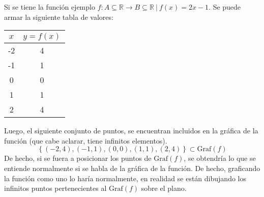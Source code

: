 \begin{example}
    Si se tiene la función ejemplo $f: A \subseteq \mathbb{R} \rightarrow B \subseteq \mathbb{R} \:|\: f(x)=2x-1$.
    Se puede armar la siguiente tabla de valores:
    \begin{table}[H]
        \centering
        \begin{tabular}{|c|c|}
            \hline
            $x$ & $y=f(x)$ \\ \hline
            -2  & 4        \\ \hline
            -1  & 1        \\ \hline
            0   & 0        \\ \hline
            1   & 1        \\ \hline
            2   & 4        \\ \hline
            \end{tabular}
      \end{table}
    Luego, el siguiente conjunto de puntos, se encuentran incluidos en la
    gráfica de la función (que cabe aclarar, tiene infinitos elementos).
    \begin{equation*}
        \left\{ (-2,4),(-1,1),(0,0),(1,1),(2,4) \right\}\subset \text{Graf}(f)
    \end{equation*}
    De hecho, si se fuera a posicionar los puntos de $\text{Graf}(f)$, se obtendría
    lo que se entiende normalmente si se habla de la gráfica de la función. De hecho,
    graficando la función como uno lo haría normalmente, en realidad
    se están dibujando los infinitos puntos pertenecientes
    al $\text{Graf}(f)$ sobre el plano.
    \begin{center}
        \end{center}
\end{example}
